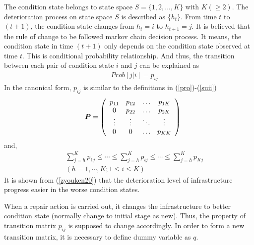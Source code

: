 The condition state belongs to state space $S = \lbrace 1, 2, ... , K\rbrace$ with $K (\geq 2)$. The deterioration process on state space $S$ is described as $\lbrace{h_t}\rbrace$. From time $t$ to $(t+1)$, the condition state changes from $h_{t} = i$ to $h_{t+1} = j$. It is believed that the rule of change to be followed markov chain decision process. It means, the condition state in time $(t+1)$ only depends on the condition state observed at time $t$. This is conditional probability relationship. And thus, the transition between each pair of condition state $i$ and $j$ can be explained as
\begin{eqnarray}
&& Prob[j|i]=p_{ij}
\end{eqnarray}
In the canonical form, $p_{ij}$ is similar to the definitions in (\ref{pro})-(\ref{suii})
\begin{eqnarray}
&& \mbox{\boldmath$P$}
=\left(
	\begin{array}{cccc}
		p_{11} & p_{12} & \ldots & p_{1K} \cr
		0 & p_{22} &  \ldots & p_{2K} \cr
		\vdots & \vdots & \ddots & \vdots \cr
                0 & 0 & \ldots & p_{KK}
	\end{array}
	\right) \label{P}
\end{eqnarray}
and,
\begin{eqnarray}
&& \sum_{j=h}^K p_{1j}\leq \cdots \leq \sum_{j=h}^K p_{ij} \leq \cdots \leq \sum_{j=h}^K p_{Kj} \label{zyouken20} \\
&& (h=1,\cdots,K; 1\leq i\leq K) \nonumber
\end{eqnarray}
%
It is shown from (\ref{zyouken20}) that the deterioration level of infrastructure progress easier in the worse condition states.

When a repair action is carried out, it changes the infrastructure to better condition state (normally change to initial stage as new). Thus, the property of transition matrix $p_{ij}$ is supposed to change accordingly. In order to form a new transition matrix, it is necessary to define dummy variable as $q$.

